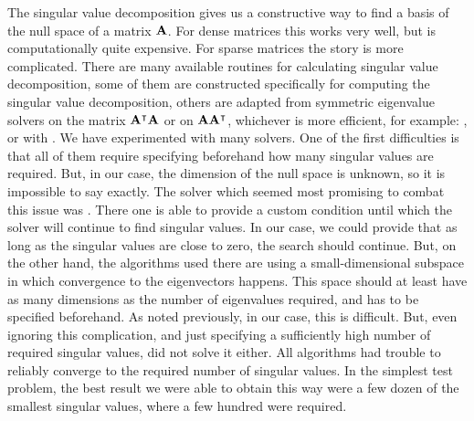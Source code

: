 The singular value decomposition gives us a constructive way to find a basis of the null space of a matrix $\vb{A}$. For dense matrices this works very well, but is computationally quite expensive. For sparse matrices the story is more complicated. There are many available routines for calculating singular value decomposition, some of them are constructed specifically for computing the singular value decomposition, others are adapted from symmetric eigenvalue solvers on the matrix ${\vb{A}}^\intercal\vb{A}$ or on $\vb{A}{\vb{A}}^\intercal$, whichever is more efficient, for example: \slepc \cite{hernandez_slepc_2005}, \spectra \cite{qiu_yixuan_2022} or \scipy \cite{virtanen_scipy_2020} with \arpack \cite{lehoucq_arpack_1998}. We have experimented with many solvers. One of the first difficulties is that all of them require specifying beforehand how many singular values are required. But, in our case, the dimension of the null space is unknown, so it is impossible to say exactly. The solver which seemed most promising to combat this issue was \slepc \cite{hernandez_slepc_2005}. There one is able to provide a custom condition until which the solver will continue to find singular values. In our case, we could provide that as long as the singular values are close to zero, the search should continue. But, on the other hand, the algorithms used there are using a small-dimensional subspace in which convergence to the eigenvectors happens. This space should at least have as many dimensions as the number of eigenvalues required, and has to be specified beforehand. As noted previously, in our case, this is difficult. But, even ignoring this complication, and just specifying a sufficiently high number of required singular values, did not solve it either. All algorithms had trouble to reliably converge to the required number of singular values. In the simplest test problem, the best result we were able to obtain this way were a few dozen of the smallest singular values, where a few hundred were required.

